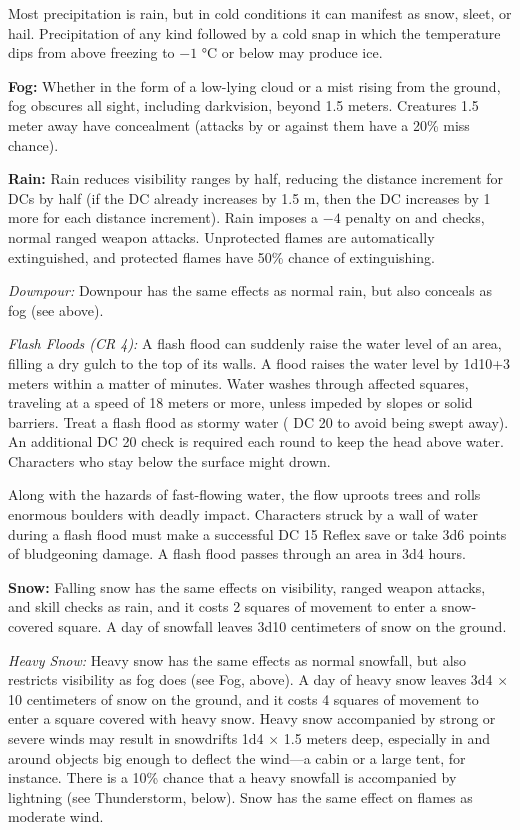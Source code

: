 Most precipitation is rain, but in cold conditions it can manifest as snow, sleet, or hail. Precipitation of any kind followed by a cold snap in which the temperature dips from above freezing to $-1$ °C or below may produce ice.

\textbf{Fog:} Whether in the form of a low-lying cloud or a mist rising from the ground, fog obscures all sight, including darkvision, beyond 1.5 meters. Creatures 1.5 meter away have concealment (attacks by or against them have a 20\% miss chance).

\textbf{Rain:} Rain reduces visibility ranges by half, reducing the distance increment for  DCs by half (if the DC already increases by 1.5 m, then the DC increases by 1 more for each distance increment). Rain imposes a $-4$ penalty on  and  checks, normal ranged weapon attacks. Unprotected flames are automatically extinguished, and protected flames have 50\% chance of extinguishing.%

\textit{Downpour:} Downpour has the same effects as normal rain, but also conceals as fog (see above).

\textit{Flash Floods (CR 4):} A flash flood can suddenly raise the water level of an area, filling a dry gulch to the top of its walls. A flood raises the water level by 1d10+3 meters within a matter of minutes. Water washes through affected squares, traveling at a speed of 18 meters or more, unless impeded by slopes or solid barriers. Treat a flash flood as stormy water ( DC 20 to avoid being swept away). An additional DC 20  check is required each round to keep the head above water. Characters who stay below the surface might drown.

Along with the hazards of fast-flowing water, the flow uproots trees and rolls enormous boulders with deadly impact. Characters struck by a wall of water during a flash flood must make a successful DC 15 Reflex save or take 3d6 points of bludgeoning damage. A flash flood passes through an area in 3d4 hours.

\textbf{Snow:} Falling snow has the same effects on visibility, ranged weapon attacks, and skill checks as rain, and it costs 2 squares of movement to enter a snow-covered square. A day of snowfall leaves 3d10 centimeters of snow on the ground.

\textit{Heavy Snow:} Heavy snow has the same effects as normal snowfall, but also restricts visibility as fog does (see Fog, above). A day of heavy snow leaves 3d4 $\times$ 10 centimeters of snow on the ground, and it costs 4 squares of movement to enter a square covered with heavy snow. Heavy snow accompanied by strong or severe winds may result in snowdrifts 1d4 $\times$ 1.5 meters deep, especially in and around objects big enough to deflect the wind---a cabin or a large tent, for instance. There is a 10\% chance that a heavy snowfall is accompanied by lightning (see Thunderstorm, below). Snow has the same effect on flames as moderate wind.

